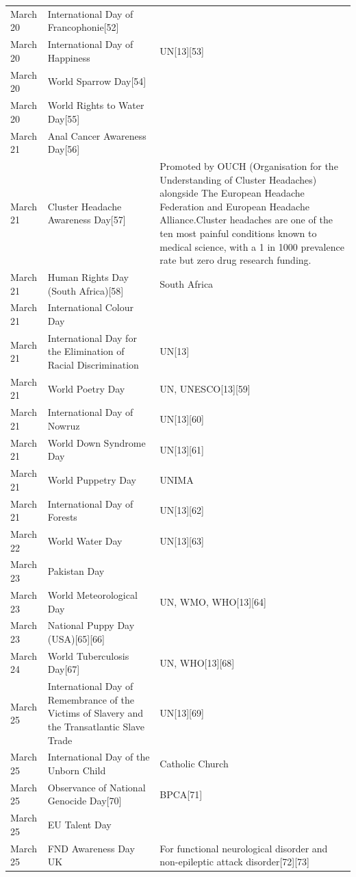 \documentclass[
  openany]{book}
\begin{document}
\begin{longtable}[t]{>{\raggedright\arraybackslash}p{8em}>{\raggedright\arraybackslash}p{20em}>{\raggedright\arraybackslash}p{12em}}
March 20 & International Day of Francophonie[52] & \\
March 20 & International Day of Happiness & UN[13][53]\\
March 20 & World Sparrow Day[54] & \\
\addlinespace
March 20 & World Rights to Water Day[55] & \\
March 21 & Anal Cancer Awareness Day[56] & \\
March 21 & Cluster Headache Awareness Day[57] & Promoted by OUCH (Organisation for the Understanding of Cluster Headaches) alongside The European Headache Federation and European Headache Alliance.Cluster headaches are one of the ten most painful conditions known to medical science, with a 1 in 1000 prevalence rate but zero drug research funding.\\
March 21 & Human Rights Day (South Africa)[58] & South Africa\\
March 21 & International Colour Day & \\
\addlinespace
March 21 & International Day for the Elimination of Racial Discrimination & UN[13]\\
March 21 & World Poetry Day & UN, UNESCO[13][59]\\
March 21 & International Day of Nowruz & UN[13][60]\\
March 21 & World Down Syndrome Day & UN[13][61]\\
March 21 & World Puppetry Day & UNIMA\\
\addlinespace
March 21 & International Day of Forests & UN[13][62]\\
March 22 & World Water Day & UN[13][63]\\
March 23 & Pakistan Day & \\
March 23 & World Meteorological Day & UN, WMO, WHO[13][64]\\
March 23 & National Puppy Day (USA)[65][66] & \\
\addlinespace
March 24 & World Tuberculosis Day[67] & UN, WHO[13][68]\\
March 25 & International Day of Remembrance of the Victims of Slavery and the Transatlantic Slave Trade & UN[13][69]\\
March 25 & International Day of the Unborn Child & Catholic Church\\
March 25 & Observance of National Genocide Day[70] & BPCA[71]\\
March 25 & EU Talent Day & \\
\addlinespace
March 25 & FND Awareness Day UK & For functional neurological disorder and non-epileptic attack disorder[72][73]\\

\end{longtable}
\end{document}
